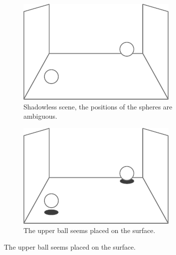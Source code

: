 \begin{figure}[!b]
    \centering
    \begin{subfigure}{0.4\textwidth}
        \includegraphics[width=\textwidth]{./graf/shadow_example_no_shadow.pdf}
        \caption{Shadowless scene, the positions of the spheres are ambiguous.}
        \label{fig:shadow_balls_no_shadow}
    \end{subfigure}
    \hfill
    \begin{subfigure}{0.4\textwidth}
        \includegraphics[width=\textwidth]{./graf/shadow_example_shadow_1.pdf}
        \caption{The upper ball seems placed on the surface.}
        \label{fig:shadow_balls_shadow_1}
    \end{subfigure}


\end{figure}
